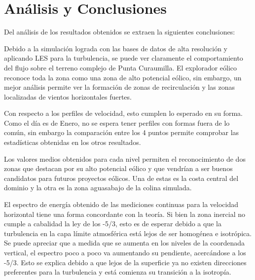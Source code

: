 \chapter{Análisis y Conclusiones}
Del análisis de los resultados obtenidos se extraen la siguientes conclusiones:
\begin{itemize*}
	\item Debido a la simulación lograda con las bases de datos de alta resolución y aplicando LES para la turbulencia, se puede ver claramente el comportamiento del flujo sobre el terreno complejo de Punta Curaumilla. El explorador eólico reconoce toda la zona como una zona de alto potencial eólico, sin embargo, un mejor análisis permite ver la formación de zonas de recirculación y las zonas localizadas de vientos horizontales fuertes.
	\item Con respecto a los perfiles de velocidad, esto cumplen lo esperado en su forma. Como el día es de Enero, no se espera tener perfiles con formas fuera de lo común, sin embargo la comparación entre los 4 puntos permite comprobar las estadísticas obtenidas en los otros resultados.
	\item Los valores medios obtenidos para cada nivel permiten el reconocimiento de dos zonas que destacan por su alto potencial eólico y que vendrían a ser buenos candidatos para futuros proyectos eólicos. Una de estas es la costa central del dominio y la otra es la zona aguasabajo de la colina simulada.
	\item El espectro de energía obtenido de las mediciones continuas para la velocidad horizontal tiene una forma concordante con la teoría. Si bien la zona inercial no cumple a cabalidad la ley de los -5/3, esto es de esperar debido a que la turbulencia en la capa límite atmosférica está lejos de ser homogénea e isotrópica. Se puede apreciar que a medida que se aumenta en los niveles de la coordenada vertical, el espectro poco a poco va aumentando su pendiente, acercándose a los -5/3. Esto se explica debido a que lejos de la superficie ya no existen direcciones preferentes para la turbulencia y está comienza su transición a la isotropía.
\end{itemize*}
